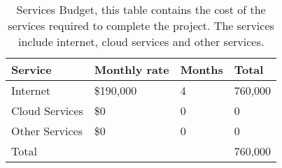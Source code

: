 \begin{table}[h]
    \centering
        \begin{tabularx}{\textwidth}{|m{3.5cm}|X|X|X| }
            \hline
            Service & Monthly rate & Months & Total\\
            \hline
            Internet & \$190,000 & 4 & 760,000 \\
            \hline
            Cloud Services & \$0 & 0 & 0\\
            \hline
            Other Services & \$0 & 0 & 0\\
            \hline
            Total & & & 760,000\\
            \hline
        \end{tabularx}
    \caption{Services Budget, this table contains the cost of the services required to complete the project. The services include internet, cloud services and other services.}
\end{table}
